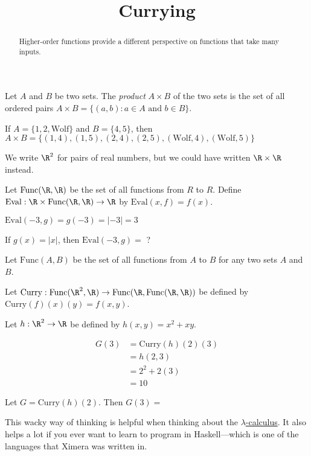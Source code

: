 \documentclass{ximera}
\title{Currying}
\begin{document}
\begin{abstract}
  Higher-order functions provide a different perspective on functions that take many inputs.
\end{abstract}

\begin{definition}
  Let $A$ and $B$ be two sets.  The \textit{product} $A\times B$ of
  the two sets is the set of all ordered pairs $A \times B = \{ (a,b):
  a \in A \text{ and } b \in B\}$.
\end{definition}

\begin{example}
  If $A = \{ 1,2,\text{Wolf}\}$ and $B = \{4,5\}$, then $A \times B =
  \{(1,4),(1,5),(2,4),(2,5),(\text{Wolf},4),(\text{Wolf},5)\}$
\end{example}

\begin{example}
  We write $\R^2$ for pairs of real numbers, but we could have written
  $\R \times \R$ instead.
\end{example}

\begin{question}
  Let $\text{Func}(\R,\R)$ be the set of all functions from $R$ to
  $R$.  Define $\text{Eval}: \R \times \text{Func}(\R,\R) \to \R$ by
  $\text{Eval}(x,f) = f(x)$.
\begin{solution}
\begin{hint}
	$\text{Eval}(-3,g) = g(-3)=|-3|=3$
\end{hint}
If $g(x) = |x|$, then $\text{Eval}(-3,g)=$ ?
\end{solution}
\end{question}

\begin{question}
  Let $\text{Func}(A,B)$ be the set of all functions from $A$ to $B$ for any two sets $A$ and $B$.  
  
  Let $\text{Curry}:\text{Func}(\R^2,\R) \to  \text{Func}(\R,\text{Func}(\R,\R))$ be defined by $\text{Curry}(f)(x)(y) = f(x,y)$.

  Let $h:\R^2 \to \R$ be defined by $h(x,y) = x^2 +xy$.  
  \begin{solution}
    \begin{hint}
      \begin{align*}
        G(3) &= \text{Curry}(h)(2)(3)\\
        &= h(2,3)\\
        &= 2^2+2(3)\\
        &=10
      \end{align*}
    \end{hint}
    Let $G = \text{Curry}(h)(2)$.  Then $G(3) =$ 
  \end{solution}
  
  This wacky way of thinking is helpful when thinking about the
  \href{http://en.wikipedia.org/wiki/Lambda_calculus}{$\lambda$-calculus}.
  It also helps a lot if you ever want to learn to program in
  Haskell---which is one of the languages that Ximera was written in.
  
\end{question}
\end{document}
